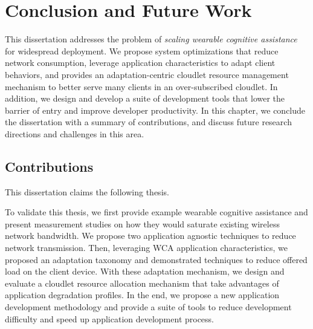 \chapter{Conclusion and Future Work}

This dissertation addresses the problem of \textit{scaling wearable cognitive
assistance} for widespread deployment. We propose system optimizations that
reduce network consumption, leverage application characteristics to adapt client
behaviors, and provides an adaptation-centric cloudlet resource management
mechanism to better serve many clients in an over-subscribed cloudlet. In
addition, we design and develop a suite of development tools that lower the
barrier of entry and improve developer productivity. In this chapter, we
conclude the dissertation with a summary of contributions, and discuss future
research directions and challenges in this area.

\section{Contributions}

This dissertation claims the following thesis.

\noindent{}

To validate this thesis, we first provide example wearable cognitive assistance
and present measurement studies on how they would saturate existing wireless
network bandwidth. We propose two application agnostic techniques to reduce
network transmission. Then, leveraging WCA application characteristics, we
proposed an adaptation taxonomy and demonstrated techniques to reduce offered
load on the client device. With these adaptation mechanism, we design and
evaluate a cloudlet resource allocation mechanism that take advantages of
application degradation profiles. In the end, we propose a new application
development methodology and provide a suite of tools to reduce development
difficulty and speed up application development process.

